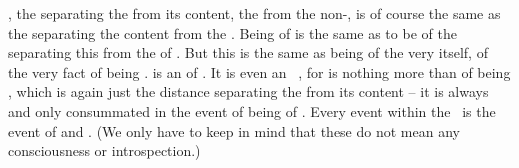 \pa\label{pa:selfaware} , the  separating the
 from its content, the  from the non-,
is of course the same as the  separating the content from the
.  Being  of \thi{\ldots} is the same as to
be  of the  separating this \thi{\ldots} from the
 of .  But this is the same as being
 of the very  itself, of the very fact of
being .   is an  of
.  It is even an \equi\ , for
 is nothing more than  of being
, which is again just the distance separating the 
from its content -- it is always and only consummated in the event of
being  of \thi{\ldots}.
Every event within the \hoa\ is the event of  and 
. (We only have to keep in mind that these 
 do not mean any  consciousness or 
introspection.)

